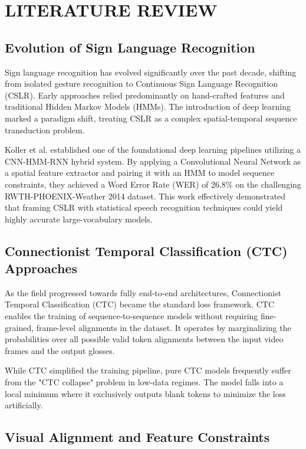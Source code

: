 \chapter{LITERATURE REVIEW}

\section{Evolution of Sign Language Recognition}

Sign language recognition has evolved significantly over the past decade, shifting from isolated gesture recognition to Continuous Sign Language Recognition (CSLR). Early approaches relied predominantly on hand-crafted features and traditional Hidden Markov Models (HMMs). The introduction of deep learning marked a paradigm shift, treating CSLR as a complex spatial-temporal sequence transduction problem.

Koller et al. \cite{koller2015continuous} established one of the foundational deep learning pipelines utilizing a CNN-HMM-RNN hybrid system. By applying a Convolutional Neural Network as a spatial feature extractor and pairing it with an HMM to model sequence constraints, they achieved a Word Error Rate (WER) of 26.8\% on the challenging RWTH-PHOENIX-Weather 2014 dataset. This work effectively demonstrated that framing CSLR with statistical speech recognition techniques could yield highly accurate large-vocabulary models.

\section{Connectionist Temporal Classification (CTC) Approaches}

As the field progressed towards fully end-to-end architectures, Connectionist Temporal Classification (CTC) \cite{graves2006connectionist} became the standard loss framework. CTC enables the training of sequence-to-sequence models without requiring fine-grained, frame-level alignments in the dataset. It operates by marginalizing the probabilities over all possible valid token alignments between the input video frames and the output glosses. 

While CTC simplified the training pipeline, pure CTC models frequently suffer from the "CTC collapse" problem in low-data regimes. The model falls into a local minimum where it exclusively outputs blank tokens to minimize the loss artificially. 

\section{Visual Alignment and Feature Constraints}

